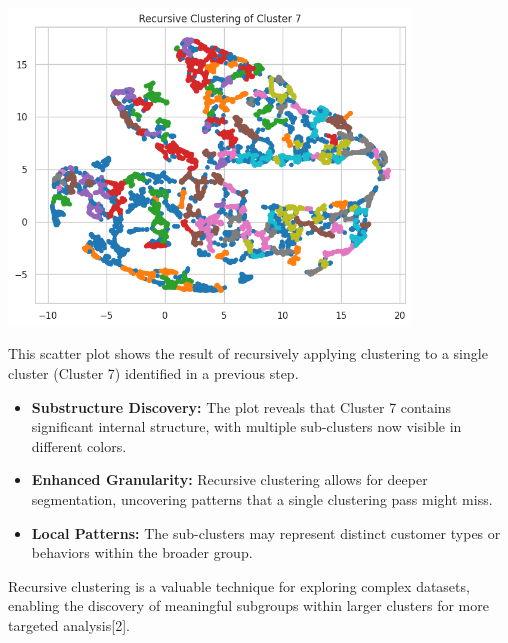 \documentclass[a4paper]{article}
\begin{document}
\begin{multicols}{2}
\noindent
\begin{minipage}{\columnwidth}
\centering
\includegraphics[width=0.8\textwidth]{plots/Recursive Clustering.png}
\label{fig:recursive_clustering}
\end{minipage}

This scatter plot shows the result of recursively applying clustering to a single cluster (Cluster 7) identified in a previous step.

\begin{itemize}
    \item \textbf{Substructure Discovery:} The plot reveals that Cluster 7 contains significant internal structure, with multiple sub-clusters now visible in different colors.
    \item \textbf{Enhanced Granularity:} Recursive clustering allows for deeper segmentation, uncovering patterns that a single clustering pass might miss.
    \item \textbf{Local Patterns:} The sub-clusters may represent distinct customer types or behaviors within the broader group.
\end{itemize}

Recursive clustering is a valuable technique for exploring complex datasets, enabling the discovery of meaningful subgroups within larger clusters for more targeted analysis[2].

\vspace{1em}


\end{multicols}
\end{document}
